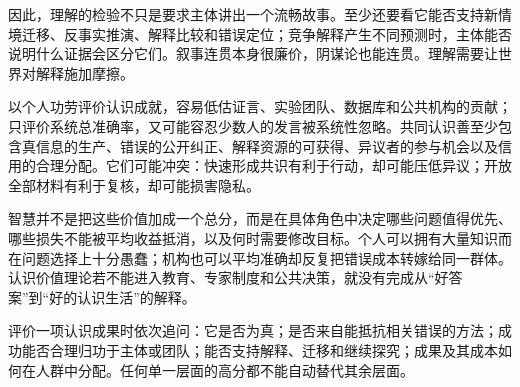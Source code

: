 因此，理解的检验不只是要求主体讲出一个流畅故事。至少还要看它能否支持新情境迁移、反事实推演、解释比较和错误定位；竞争解释产生不同预测时，主体能否说明什么证据会区分它们。叙事连贯本身很廉价，阴谋论也能连贯。理解需要让世界对解释施加摩擦。

以个人功劳评价认识成就，容易低估证言、实验团队、数据库和公共机构的贡献；只评价系统总准确率，又可能容忍少数人的发言被系统性忽略。共同认识善至少包含真信息的生产、错误的公开纠正、解释资源的可获得、异议者的参与机会以及信用的合理分配。它们可能冲突：快速形成共识有利于行动，却可能压低异议；开放全部材料有利于复核，却可能损害隐私。

智慧并不是把这些价值加成一个总分，而是在具体角色中决定哪些问题值得优先、哪些损失不能被平均收益抵消，以及何时需要修改目标。个人可以拥有大量知识而在问题选择上十分愚蠢；机构也可以平均准确却反复把错误成本转嫁给同一群体。认识价值理论若不能进入教育、专家制度和公共决策，就没有完成从“好答案”到“好的认识生活”的解释。

\begin{argumentbox}
评价一项认识成果时依次追问：它是否为真；是否来自能抵抗相关错误的方法；成功能否合理归功于主体或团队；能否支持解释、迁移和继续探究；成果及其成本如何在人群中分配。任何单一层面的高分都不能自动替代其余层面。
\end{argumentbox}

